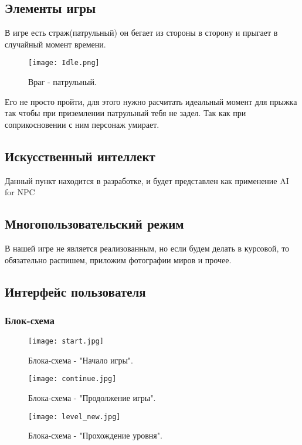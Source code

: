 \documentclass[a4paper,12pt]{article}
\begin{document}
\subsection{Элементы игры}
В игре есть страж(патрульный) он бегает из стороны в сторону и прыгает в случайный момент времени.
    \begin{figure}[H] 
    \centering
    \texttt{[image: Idle.png]} 
    \caption{Враг - патрульный.}
    \label{fig:player_character}
    \end{figure}
Его не просто пройти, для этого нужно расчитать идеальный момент для прыжка так чтобы при приземлении патрульный тебя не задел. Так как при соприкосновении с ним персонаж умирает.

\subsection{Искусственный интеллект}
Данный пункт находится в разработке, и будет представлен как применение AI for NPC

\subsection{Многопользовательский режим}
В нашей игре не является реализованным, но если будем делать в курсовой, то обязательно распишем, приложим фотографии миров и прочее.

\subsection{Интерфейс пользователя}


\subsubsection{Блок-схема}
    \begin{figure}[H] %
    \centering
    \texttt{[image: start.jpg]} %
    \caption{Блока-схема - "Начало игры".}
    \label{fig:player_character}
    \end{figure}

    \begin{figure}[H] %
    \centering
    \texttt{[image: continue.jpg]} %
    \caption{Блока-схема - "Продолжение игры".}
    \label{fig:player_character}
    \end{figure}

    \begin{figure}[H] %
    \centering
    \texttt{[image: level\_new.jpg]} %
    \caption{Блока-схема - "Прохождение уровня".}
    \label{fig:player_character}
    \end{figure}
\end{document}
